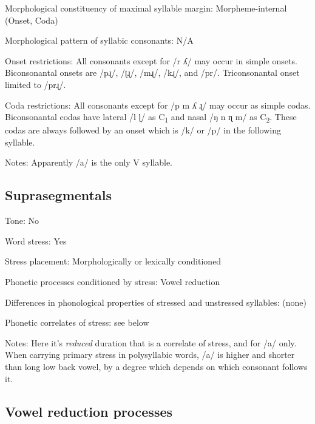 {\begin{appendixdesc}
\item[Morphological constituency of maximal syllable margin:] Morpheme-internal (Onset, Coda)

\item[Morphological pattern of syllabic consonants:] N/A

\item[Onset restrictions:] All consonants except for /r ʎ/ may occur in simple onsets. Biconsonantal onsets are /pɻ/, /ʈɻ/, /mɻ/, /kɻ/, and /pr/. Triconsonantal onset limited to /prɻ/.

\item[Coda restrictions:] All consonants except for /p m ʎ ɻ/ may occur as simple codas. Biconsonantal codas have lateral /l ɭ/ as C\textsubscript{1} and nasal /ŋ n ɳ m/ as C\textsubscript{2}. These codas are always followed by an onset which is /k/ or /p/ in the following syllable.

\item[Notes:] Apparently /a/ is the only V syllable.
\end{appendixdesc}
\subsection*{Suprasegmentals}
\begin{appendixdesc}
\item[Tone:] No

\item[Word stress:] Yes

\item[Stress placement:] Morphologically or lexically conditioned

\item[Phonetic processes conditioned by stress:] Vowel reduction

\item[Differences in phonological properties of stressed and unstressed syllables:] (none)

\item[Phonetic correlates of stress:] see below

\item[Notes:] Here it’s \textit{reduced} duration that is a correlate of stress, and for /a/ only. When carrying primary stress in polysyllabic words, /a/ is higher and shorter than long low back vowel, by a degree which depends on which consonant follows it.
\end{appendixdesc}
\subsection*{Vowel reduction processes}
\begin{appendixdesc}


\end{appendixdesc}}
